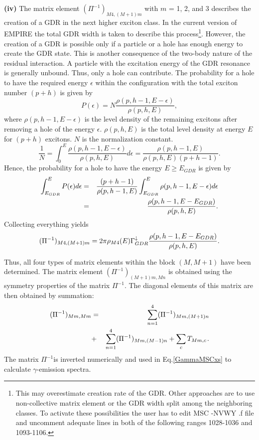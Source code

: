 \smallskip \textbf{(iv)} The matrix element $(\Pi^{-1})_{M4,(M+1)m}$ with $m$
= 1, 2, and 3 describes the creation of a GDR in the next higher exciton
class. In the current version of EMPIRE the total GDR width is taken to
describe this process\footnote{%
This may overestimate creation rate of the GDR. Other approaches are to use
non-collective matrix element or the GDR width split among the neighboring
classes. To activate these possibilities the user has to edit MSC%
-NVWY%
.f file and uncomment adequate lines in both of the following
ranges 1028-1036 and 1093-1106.}. However, the creation of a GDR is possible
only if a particle or a hole has enough energy to create the GDR state. This
is another consequence of the two-body nature of the residual interaction. A
particle with the excitation energy of the GDR resonance is generally
unbound. Thus, only a hole can contribute. The probability for a hole to
have the required energy $\epsilon$ within the configuration with the total
exciton number $(p+h)$ is given by
\begin{equation}
P(\epsilon)=N%
\frac{\rho(p,h-1,E-\epsilon)}{\rho(p,h,E)},
\end{equation}
where $\rho(p,h-1,E-\epsilon)$ is the level density%
 of the remaining excitons after removing a hole
of the energy $\epsilon$. $\rho(p,h,E)$ is the total level density at energy
$E$ for $(p+h)$ excitons. $N$ is the normalization constant.
\begin{equation}
\frac{1}{N}=\int_{0}^{E}\frac{\rho(p,h-1,E-\epsilon)}{\rho(p,h,E)}d\epsilon=%
\frac{\rho(p,h-1,E)}{\rho(p,h,E)(p+h-1)}.
\end{equation}
Hence, the probability for a hole to have the energy $E\geq E_{GDR}$ is
given by
\begin{eqnarray}
\int_{E_{GDR}}^{E}P(\epsilon)d\epsilon & = & \frac{(p+h-1)}{\rho(p,h-1,E)}%
\int_{E_{GDR}}^{E}\rho(p,h-1,E-\epsilon)d\epsilon  \notag \\
& = & \frac{\rho(p,h-1,E-E_{GDR})}{\rho(p,h,E)}.
\end{eqnarray}
Collecting everything yields
\begin{equation}
(\Pi^{-1})_{M4,(M+1)m}=2\pi\rho_{M4}(E)\Gamma_{GDR}^{\downarrow}\frac{%
\rho(p,h-1,E-E_{GDR})}{\rho(p,h,E)}.
\end{equation}

Thus, all four types of matrix elements within the block $(M,M+1)$ have been
determined. The matrix element $(\Pi^{-1})_{(M+1)m,Mn}$ is obtained using
the symmetry properties of the matrix $\Pi^{-1}$. The diagonal elements of
this matrix are then obtained by summation:
\begin{eqnarray}
(\Pi^{-1})_{Mm,Mm} &=& \sum_{n=1}^{4}(\Pi^{-1})_{Mm,(M+1)n} \\
&+& \sum_{n=1}^{4}(\Pi^{-1})_{Mm,(M-1)n} + \sum_{c}T_{Mm,c} \hspace{1pt}.
\notag
\end{eqnarray}
The matrix $\Pi^{-1}$is inverted numerically and used in Eq.\ref{GammaMSCxs}
to calculate $\gamma$-emission spectra.


